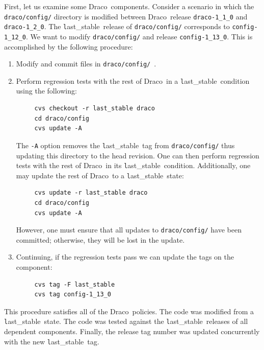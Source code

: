 \documentclass[11pt]{nmemo}
\newcommand{\draco}{{\normalfont\normalsize\textsf Draco}}
\newcommand{\stable}{{\normalfont\normalsize\texttt last\_stable}}
\begin{document}
First, let us examine some \draco\ components.  Consider a scenario in
which the \texttt{draco/config/} directory is modified between \draco\ 
release \texttt{draco-1\_1\_0} and \texttt{draco-1\_2\_0}.  The
\stable\ release of \texttt{draco/config/} corresponds to
\texttt{config-1\_12\_0}.  We want to modify \texttt{draco/config/}
and release \texttt{config-1\_13\_0}.  This is accomplished by the
following procedure:
\begin{enumerate}
\item Modify and commit files in \texttt{draco/config/}\ .
\item Perform regression tests with the rest of \draco\ in a \stable\ 
  condition using the following:
\begin{verbatim}
     cvs checkout -r last_stable draco
     cd draco/config
     cvs update -A
\end{verbatim}
  The \texttt{-A} option removes the \stable\ tag from
  \texttt{draco/config/} thus updating this directory to the head
  revision.  One can then perform regression tests with the rest of
  \draco\ in its \stable\ condition.  Additionally, one may update the 
  rest of \draco\ to a \stable\ state:
\begin{verbatim}
     cvs update -r last_stable draco
     cd draco/config
     cvs update -A
\end{verbatim}
  However, one must ensure that all updates to \texttt{draco/config/}
  have been committed; otherwise, they will be lost in the update.
\item Continuing, if the regression tests pass we can update the tags
  on the component:
\begin{verbatim}
     cvs tag -F last_stable
     cvs tag config-1_13_0
\end{verbatim}
\end{enumerate}
This procedure satisfies all of the \draco\ policies.  The code was
modified from a \stable\ state.  The code was tested against the
\stable\ releases of all dependent components.  Finally, the release
tag number was updated concurrently with the new \stable\ tag.
\end{document}
